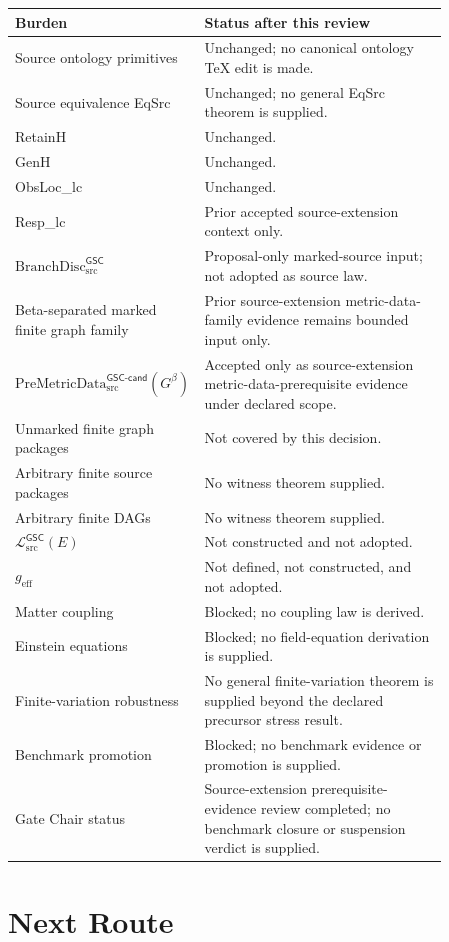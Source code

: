 \documentclass[11pt]{article}
\newcommand{\BranchDisc}{\mathrm{BranchDisc}_{\mathrm{src}}^{\mathsf{GSC}}}
\newcommand{\PreMetricData}{\mathrm{PreMetricData}_{\mathrm{src}}^{\mathsf{GSC\mbox{-}cand}}}
\newcommand{\Gbeta}{G^{\beta}}
\newcommand{\MetricData}{\mathcal{L}_{\mathrm{src}}^{\mathsf{GSC}}}
\newcommand{\geff}{g_{\mathrm{eff}}}
\begin{document}
\begin{longtable}{p{0.30\linewidth}p{0.56\linewidth}}
\toprule
Burden & Status after this review \\
\midrule
Source ontology primitives & Unchanged; no canonical ontology TeX edit is made. \\
Source equivalence EqSrc & Unchanged; no general EqSrc theorem is supplied. \\
RetainH & Unchanged. \\
GenH & Unchanged. \\
ObsLoc\_lc & Unchanged. \\
Resp\_lc & Prior accepted source-extension context only. \\
\(\BranchDisc\) & Proposal-only marked-source input; not adopted as source law. \\
Beta-separated marked finite graph family & Prior source-extension metric-data-family evidence remains bounded input only. \\
\(\PreMetricData(\Gbeta)\) & Accepted only as source-extension metric-data-prerequisite evidence under declared scope. \\
Unmarked finite graph packages & Not covered by this decision. \\
Arbitrary finite source packages & No witness theorem supplied. \\
Arbitrary finite DAGs & No witness theorem supplied. \\
\(\MetricData(E)\) & Not constructed and not adopted. \\
\(\geff\) & Not defined, not constructed, and not adopted. \\
Matter coupling & Blocked; no coupling law is derived. \\
Einstein equations & Blocked; no field-equation derivation is supplied. \\
Finite-variation robustness & No general finite-variation theorem is supplied beyond the declared precursor stress result. \\
Benchmark promotion & Blocked; no benchmark evidence or promotion is supplied. \\
Gate Chair status & Source-extension prerequisite-evidence review completed; no benchmark closure or suspension verdict is supplied. \\
\bottomrule
\end{longtable}

\section{Next Route}
\end{document}
